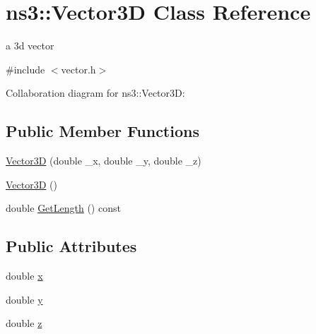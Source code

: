 \hypertarget{classns3_1_1Vector3D}{}\section{ns3\+:\+:Vector3D Class Reference}
\label{classns3_1_1Vector3D}


a 3d vector  




{\ttfamily \#include $<$vector.\+h$>$}



Collaboration diagram for ns3\+:\+:Vector3D\+:
\subsection*{Public Member Functions}
\begin{DoxyCompactItemize}
\item 
\hyperlink{classns3_1_1Vector3D_a0a0b720fe39a728d684f55eddc9949e4}{Vector3D} (double \+\_\+x, double \+\_\+y, double \+\_\+z)
\item 
\hyperlink{classns3_1_1Vector3D_a99e0529991415af1083d745b43ddb61f}{Vector3D} ()
\item 
double \hyperlink{classns3_1_1Vector3D_aea4753d728b5c3f0a58f2a9f82c39c4f}{Get\+Length} () const 
\end{DoxyCompactItemize}
\subsection*{Public Attributes}
\begin{DoxyCompactItemize}
\item 
double \hyperlink{classns3_1_1Vector3D_a59dbc5dc984a4fea2819e042d2d6109c}{x}
\item 
double \hyperlink{classns3_1_1Vector3D_ae679257823406b2e008be04316e4245f}{y}
\item 
double \hyperlink{classns3_1_1Vector3D_ac31aba8cd85d66f8cf52e4b4c313f415}{z}
\end{DoxyCompactItemize}
